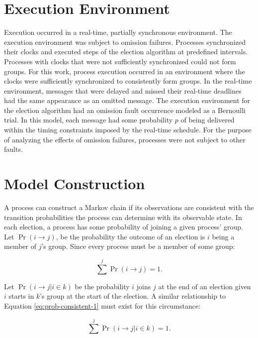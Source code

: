 \section{Execution Environment}

Execution occurred in a real-time, partially synchronous environment.
The execution environment was subject to omission failures.
Processes synchronized their clocks and executed steps of the election algorithm at predefined intervals.
Processes with clocks that were not sufficiently synchronized could not form groups.
For this work, process execution occurred in an environment where the clocks were sufficiently synchronized to consistently form groups.
In the real-time environment, messages that were delayed and missed their real-time deadlines had the same appearance as an omitted message.
The execution environment for the election algorithm had an omission fault occurrence modeled as a Bernoulli trial.
In this model, each message had some probability $p$ of being delivered within the timing constraints imposed by the real-time schedule.
For the purpose of analyzing the effects of omission failures, processes were not subject to other faults.

\section{Model Construction}

A process can construct a Markov chain if its observations are consistent with the transition probabilities the process can determine with its observable state.
In each election, a process has some probability of joining a given process' group.
Let $\Pr(i \rightarrow j)$, be the probability the outcome of an election is $i$ being a member of $j$'s group.
Since every process must be a member of some group:

\begin{equation}
\sum^{j} \Pr(i \rightarrow j) = 1.
\label{eq:prob-consistent-1}
\end{equation}

Let $\Pr(i \rightarrow j | i \in k)$ be the probability $i$ joins $j$ at the end of an election given $i$ starts in $k$'s group at the start of the election.
A similar relationship to Equation \ref{eq:prob-consistent-1} must exist for this circumstance:

\begin{equation}
\sum^{j} \Pr(i \rightarrow j | i \in k) = 1.
\label{eq:prob-consistent-2}
\end{equation}

